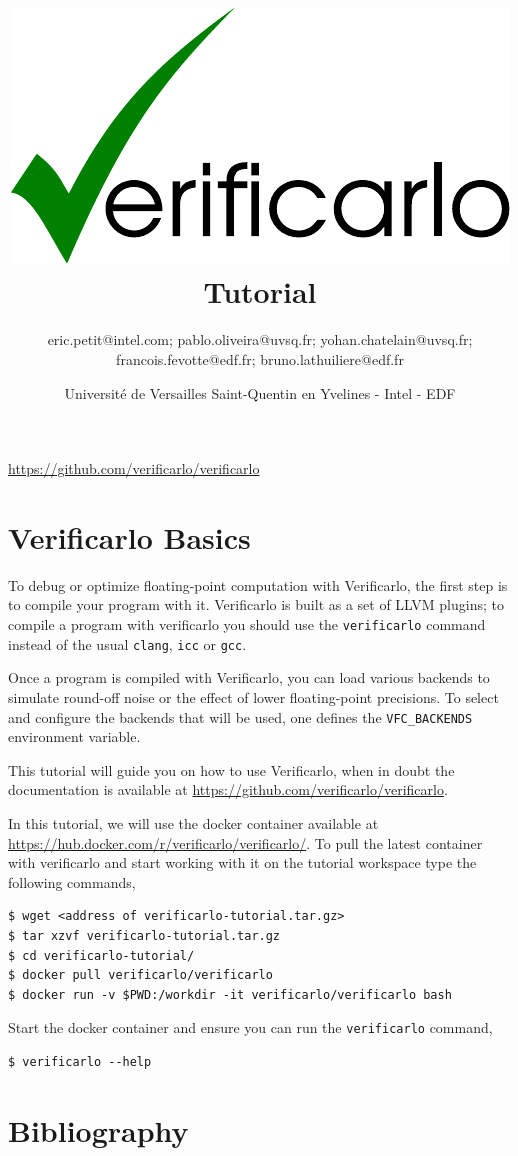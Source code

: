 \documentclass{TP}
\title{\includegraphics[keepaspectratio, scale=0.4]{verificarlo-logo.pdf}\\[4mm]
  Tutorial}
\author{eric.petit@intel.com; pablo.oliveira@uvsq.fr; yohan.chatelain@uvsq.fr;
  francois.fevotte@edf.fr; bruno.lathuiliere@edf.fr}
\date{Université de Versailles Saint-Quentin en Yvelines - Intel - EDF}
\begin{document}
\maketitle

\centerline{\url{https://github.com/verificarlo/verificarlo}}
\tableofcontents


\section{Verificarlo Basics}

To debug or optimize floating-point computation with Verificarlo, the first
step is to compile your program with it. Verificarlo is built as a set of LLVM
plugins; to compile a program with verificarlo you should use the \texttt{verificarlo}
command instead of the usual \texttt{clang}, \texttt{icc} or \texttt{gcc}.

Once a program is compiled with Verificarlo, you can load various backends to
simulate round-off noise or the effect of lower floating-point precisions.  To
select and configure the backends that will be used, one defines the
\texttt{VFC\_BACKENDS} environment variable.

This tutorial will guide you on how to use Verificarlo, when in doubt the
documentation is available at \url{https://github.com/verificarlo/verificarlo}.

In this tutorial, we will use the docker container available at
\url{https://hub.docker.com/r/verificarlo/verificarlo/}.
To pull the latest container with verificarlo and start working with it on
the tutorial workspace type the following commands,
\begin{verbatim}
$ wget <address of verificarlo-tutorial.tar.gz>
$ tar xzvf verificarlo-tutorial.tar.gz
$ cd verificarlo-tutorial/
$ docker pull verificarlo/verificarlo
$ docker run -v $PWD:/workdir -it verificarlo/verificarlo bash
\end{verbatim}

\begin{question}
  Start the docker container and ensure you can run the \texttt{verificarlo} command,
\begin{verbatim}
$ verificarlo --help
\end{verbatim}
\end{question}







\newpage

\section{Bibliography}

\end{document}
